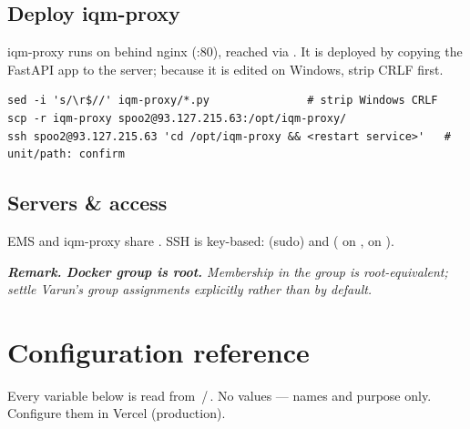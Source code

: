 \documentclass[11pt]{article}
\newenvironment{remark}
  {\par\medskip\noindent\small\itshape\textbf{\upshape Remark.}\hspace{0.4em}\ignorespaces}
  {\par\medskip}
\begin{document}
\subsection{Deploy iqm-proxy}
iqm-proxy runs on  behind nginx (:80), reached via . It is deployed by copying
the FastAPI app to the server; because it is edited on Windows, strip CRLF first.
\begin{lstlisting}[caption={deploy iqm-proxy to 93.127.215.63},captionpos=b]
sed -i 's/\r$//' iqm-proxy/*.py               # strip Windows CRLF
scp -r iqm-proxy spoo2@93.127.215.63:/opt/iqm-proxy/
ssh spoo2@93.127.215.63 'cd /opt/iqm-proxy && <restart service>'   # unit/path: confirm
\end{lstlisting}

\subsection{Servers \& access}
EMS and iqm-proxy share . SSH is key-based:  (sudo) and  ( on ,
 on ).
\begin{remark}
\textbf{\upshape Docker group is root.} Membership in the  group is root-equivalent; settle Varun's group
assignments explicitly rather than by default.
\end{remark}

\section{Configuration reference}
Every variable below is read from \,/\,. No values --- names and purpose only. Configure
them in Vercel (production).
\end{document}
